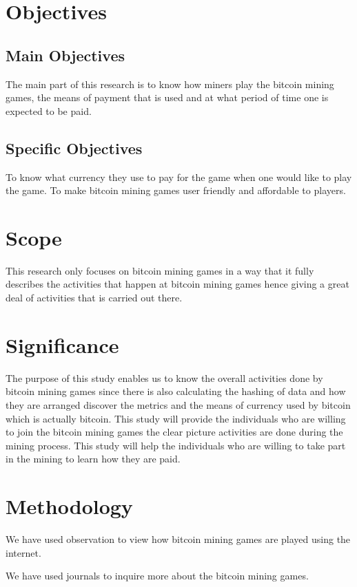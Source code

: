 \documentclass{article}
\begin{document}
\section{Objectives}
\subsection{Main Objectives}
The main part of this research is to know how miners play the bitcoin mining games, the means of payment that is used and at what period of time one is expected to be paid.

\subsection{Specific Objectives}
To know what currency they use to pay for the game when one would like to play the game.
To make bitcoin mining games user friendly and affordable to players.

\section{Scope}
This research only focuses on bitcoin mining games in a way that it fully describes the activities that happen at bitcoin mining games hence giving a great deal of activities that is carried out there.

\section{Significance}
The purpose of this study enables us to know the overall activities done by bitcoin mining games since there is also calculating the hashing of data and how they are arranged discover the metrics and the means of currency used by bitcoin which is actually bitcoin.
This study will provide the individuals who are willing to join the bitcoin mining games the clear picture activities are done during the mining process.
This study will help the individuals who are willing to take part in the mining to learn how they are paid.

\section{Methodology}

We have used observation to view how bitcoin mining games are played using the internet.

We have used journals to inquire more about the bitcoin mining games.
\end{document}
